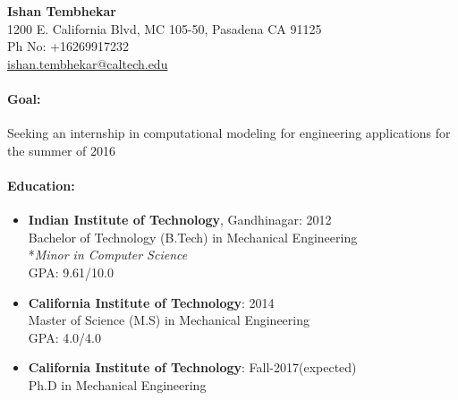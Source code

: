 \documentclass[10pt,fleqn]{article}
\begin{document}


\begin{center}
\LARGE \textbf{Ishan Tembhekar} \small \\[0.16cm]
1200 E. California Blvd, MC 105-50, Pasadena CA 91125 \\
Ph No: +16269917232 \\
\href{mailto:ishan.tembhekar@caltech.edu}{ishan.tembhekar@caltech.edu} \hfill
\end{center}
\paragraph*{Goal:} Seeking an internship in computational modeling for engineering applications for the summer of 2016  
\paragraph*{Education:}
\begin{itemize}
\setlength{\itemsep}{5pt}
\setlength{\parskip}{0pt}
\item[] \textbf{Indian Institute of Technology}, Gandhinagar: \hfill 2012\\
		Bachelor of Technology (B.Tech) in Mechanical Engineering\\
		*\textit{Minor in Computer Science}\\
		GPA: 9.61/10.0 
\item[] \textbf{California Institute of Technology}: \hfill 2014\\
		Master of Science (M.S) in Mechanical Engineering\\
		GPA: 4.0/4.0 
\item[] \textbf{California Institute of Technology}: \hfill  Fall-2017(expected)\\
		Ph.D in Mechanical Engineering 
\end{itemize}
\vspace{-20pt}
\end{document}

